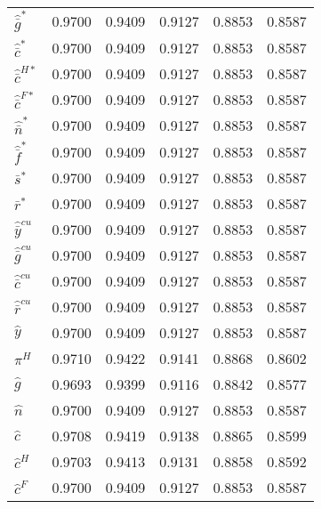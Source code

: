 \begin{center}
\begin{longtable}{lccccc}
${\hat {\bar g}^*}     $	 & 	    0.9700	 & 	    0.9409	 & 	    0.9127	 & 	    0.8853	 & 	    0.8587 \\ 
${\hat {\bar c}^*}     $	 & 	    0.9700	 & 	    0.9409	 & 	    0.9127	 & 	    0.8853	 & 	    0.8587 \\ 
${\hat {\bar c}^{H*}}  $	 & 	    0.9700	 & 	    0.9409	 & 	    0.9127	 & 	    0.8853	 & 	    0.8587 \\ 
${\hat {\bar c}^{F*}}  $	 & 	    0.9700	 & 	    0.9409	 & 	    0.9127	 & 	    0.8853	 & 	    0.8587 \\ 
${\hat {\bar n}^*}     $	 & 	    0.9700	 & 	    0.9409	 & 	    0.9127	 & 	    0.8853	 & 	    0.8587 \\ 
${\hat {\bar f}^*}     $	 & 	    0.9700	 & 	    0.9409	 & 	    0.9127	 & 	    0.8853	 & 	    0.8587 \\ 
${\bar s^*}            $	 & 	    0.9700	 & 	    0.9409	 & 	    0.9127	 & 	    0.8853	 & 	    0.8587 \\ 
${\bar r^*}            $	 & 	    0.9700	 & 	    0.9409	 & 	    0.9127	 & 	    0.8853	 & 	    0.8587 \\ 
${\hat {\bar y}^{cu}}  $	 & 	    0.9700	 & 	    0.9409	 & 	    0.9127	 & 	    0.8853	 & 	    0.8587 \\ 
${\hat {\bar g}^{cu}}  $	 & 	    0.9700	 & 	    0.9409	 & 	    0.9127	 & 	    0.8853	 & 	    0.8587 \\ 
${\hat {\bar c}^{cu}}  $	 & 	    0.9700	 & 	    0.9409	 & 	    0.9127	 & 	    0.8853	 & 	    0.8587 \\ 
${\hat {\bar r}^{cu}}  $	 & 	    0.9700	 & 	    0.9409	 & 	    0.9127	 & 	    0.8853	 & 	    0.8587 \\ 
${\hat y}              $	 & 	    0.9700	 & 	    0.9409	 & 	    0.9127	 & 	    0.8853	 & 	    0.8587 \\ 
${\pi^H}               $	 & 	    0.9710	 & 	    0.9422	 & 	    0.9141	 & 	    0.8868	 & 	    0.8602 \\ 
${\hat g}              $	 & 	    0.9693	 & 	    0.9399	 & 	    0.9116	 & 	    0.8842	 & 	    0.8577 \\ 
${\hat n}              $	 & 	    0.9700	 & 	    0.9409	 & 	    0.9127	 & 	    0.8853	 & 	    0.8587 \\ 
${\hat c}              $	 & 	    0.9708	 & 	    0.9419	 & 	    0.9138	 & 	    0.8865	 & 	    0.8599 \\ 
${\hat c^H}            $	 & 	    0.9703	 & 	    0.9413	 & 	    0.9131	 & 	    0.8858	 & 	    0.8592 \\ 
${\hat c^F}            $	 & 	    0.9700	 & 	    0.9409	 & 	    0.9127	 & 	    0.8853	 & 	    0.8587 \\ 

\end{longtable}
\end{center}
